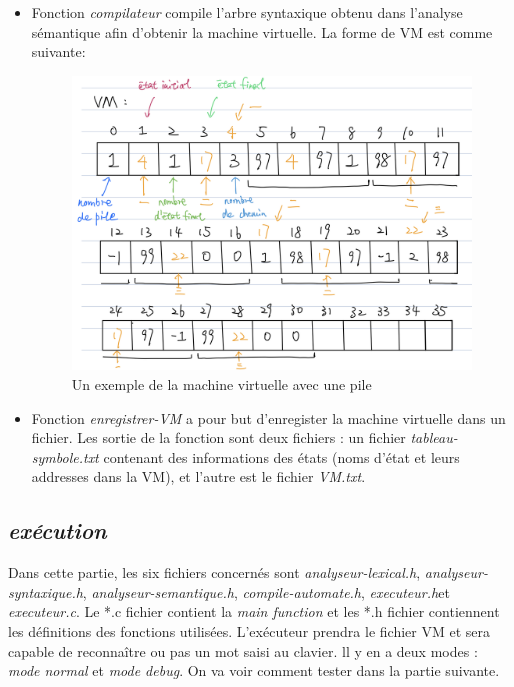 \documentclass[a4paper,14pt,UTF8]{article}
\begin{document}
	\begin{itemize}
		
		\item 
		Fonction \textit{compilateur} compile l'arbre syntaxique obtenu dans l'analyse sémantique afin d'obtenir la machine virtuelle. La forme de VM est comme suivante:  \par
		
		\begin{figure}[H]
			\setlength{\abovecaptionskip}{-0.cm}
			
			\begin{center}
				\includegraphics[width=14cm]{vm}
			\end{center}
			\caption{Un exemple de la machine virtuelle avec une pile}
		\end{figure}
	
		\item 
		Fonction \textit{enregistrer-VM} a pour but d'enregister la machine virtuelle dans un fichier. Les sortie de la fonction sont deux fichiers : un fichier \textit{tableau-symbole.txt} contenant des informations des états (noms d'état et leurs addresses dans la VM), et l'autre est le fichier \textit{VM.txt}.  \par
		
	\end{itemize}
	
	\subsection{\textit{exécution}}
	\quad Dans cette partie, les six fichiers concernés sont \textit{analyseur-lexical.h}, \textit{analyseur-syntaxique.h}, \textit{analyseur-semantique.h}, \textit{compile-automate.h}, \textit{executeur.h}et \textit{executeur.c}. Le *.c fichier contient la \textit{main function} et les *.h fichier contiennent les définitions des fonctions utilisées. L'exécuteur prendra le fichier VM et sera capable de reconnaître ou pas un mot saisi au clavier. ll y en a deux modes : \textit{mode normal} et \textit{mode debug}. On va voir comment tester dans la partie suivante.
	  
\end{document}
